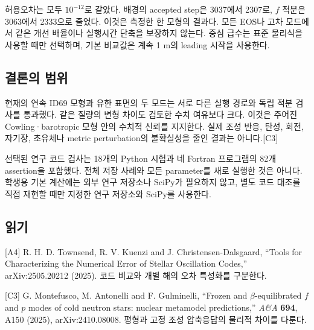\documentclass[
  10pt,
  a4paper,
]{article}
\begin{document}
허용오차는 모두 \(10^{-12}\)로 같았다. 배경의 accepted step은 3037에서
2307로, \(f\) 적분은 3063에서 2333으로 줄었다. 이것은 측정한 한 모형의
결과다. 모든 EOS나 고차 모드에서 같은 개선 배율이나 실행시간 단축을
보장하지 않는다. 중심 급수는 표준 물리식을 사용할 때만 선택하며, 기본
비교값은 계속 1 m의 leading 시작을 사용한다.

\subsection{결론의 범위}\label{uxacb0uxb860uxc758-uxbc94uxc704}

현재의 연속 ID69 모형과 유한 표면의 두 모드는 서로 다른 실행 경로와 독립
적분 검사를 통과했다. 같은 질량의 변형 차이도 검토한 수치 여유보다 크다.
이것은 주어진 Cowling·barotropic 모형 안의 수치적 신뢰를 지지한다. 실제
조성 반응, 탄성, 회전, 자기장, 초유체나 metric perturbation의 불확실성을
줄인 결과는 아니다.{[}C3{]}

선택된 연구 코드 검사는 18개의 Python 시험과 네 Fortran 프로그램의 82개
assertion을 포함했다. 전체 저장 사례와 모든 parameter를 새로 실행한 것은
아니다. 학생용 기본 계산에는 외부 연구 저장소나 SciPy가 필요하지 않고,
별도 코드 대조를 직접 재현할 때만 지정한 연구 저장소와 SciPy를 사용한다.

\subsection{읽기}\label{uxc77duxae30}

{[}A4{]} R. H. D. Townsend, R. V. Kuenzi and J. Christensen-Dalsgaard,
``Tools for Characterizing the Numerical Error of Stellar Oscillation
Codes,'' arXiv:2505.20212 (2025). 코드 비교와 개별 해의 오차 특성화를
구분한다.

{[}C3{]} G. Montefusco, M. Antonelli and F. Gulminelli, ``Frozen and
\(\beta\)-equilibrated \(f\) and \(p\) modes of cold neutron stars:
nuclear metamodel predictions,'' \emph{A\&A} \textbf{694}, A150 (2025),
arXiv:2410.08008. 평형과 고정 조성 압축응답의 물리적 차이를 다룬다.
\end{document}
